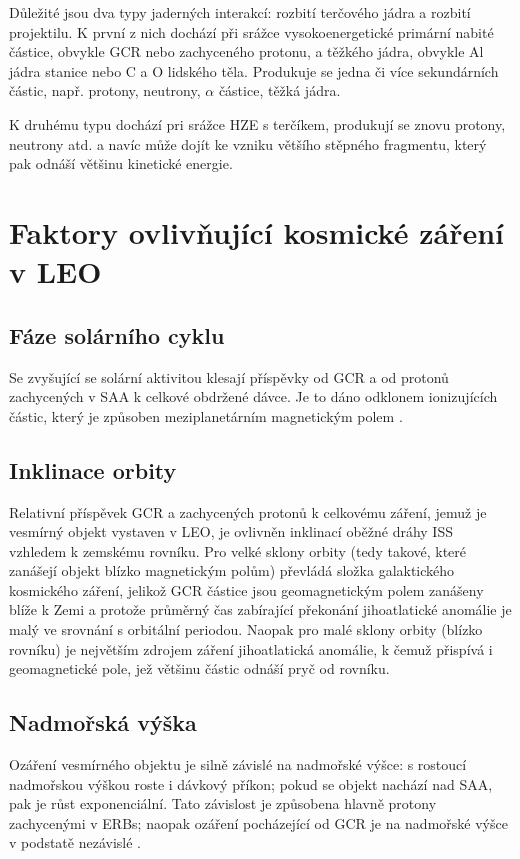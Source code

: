 Důležité jsou dva typy jaderných interakcí: rozbití terčového jádra a rozbití projektilu. K první z nich dochází při srážce vysokoenergetické primární nabité částice, obvykle GCR nebo zachyceného protonu, a těžkého jádra, obvykle Al jádra stanice nebo C a O lidského těla. Produkuje se jedna či více sekundárních částic, např. protony, neutrony, $\alpha$ částice, těžká jádra.

K druhému typu dochází pri srážce HZE s terčíkem, produkují se znovu protony, neutrony atd. a navíc může dojít ke vzniku většího stěpného fragmentu, který pak odnáší většinu kinetické energie. 

\section{Faktory ovlivňující kosmické záření v LEO}
\subsection{Fáze solárního cyklu}\label{sec:kosmickeZareni_solar}
Se zvyšující se solární aktivitou klesají příspěvky od GCR a od protonů zachycených v SAA k celkové obdržené dávce. Je to dáno odklonem ionizujících částic, který je způsoben meziplanetárním magnetickým polem \cite{dosis}.
\subsection{Inklinace orbity}
Relativní příspěvek GCR a zachycených protonů k celkovému záření, jemuž je vesmírný objekt vystaven v LEO, je ovlivněn inklinací oběžné dráhy ISS vzhledem k zemskému rovníku. Pro velké sklony orbity (tedy takové, které zanášejí objekt blízko magnetickým polům) převládá složka galaktického kosmického záření, jelikož GCR částice jsou geomagnetickým polem zanášeny blíže k Zemi a protože průměrný čas zabírající překonání jihoatlatické anomálie je malý ve srovnání s orbitální periodou. Naopak pro malé sklony orbity (blízko rovníku) je největším zdrojem záření jihoatlatická anomálie, k čemuž přispívá i geomagnetické pole, jež většinu částic odnáší pryč od rovníku.
\subsection{Nadmořská výška}\label{sec:kosmickeZareni_altitude}
Ozáření vesmírného objektu je silně závislé na nadmořské výšce: s rostoucí nadmořskou výškou roste i dávkový příkon; pokud se objekt nachází nad SAA, pak je růst exponenciální. Tato závislost je způsobena hlavně protony zachycenými v ERBs; naopak ozáření pocházející od GCR je na nadmořské výšce v podstatě nezávislé \cite{dosis}.
